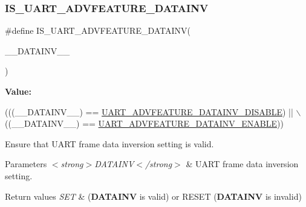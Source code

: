 \subsubsection{\texorpdfstring{I\+S\+\_\+\+U\+A\+R\+T\+\_\+\+A\+D\+V\+F\+E\+A\+T\+U\+R\+E\+\_\+\+D\+A\+T\+A\+I\+NV}{IS\_UART\_ADVFEATURE\_DATAINV}}
{\footnotesize\ttfamily \#define I\+S\+\_\+\+U\+A\+R\+T\+\_\+\+A\+D\+V\+F\+E\+A\+T\+U\+R\+E\+\_\+\+D\+A\+T\+A\+I\+NV(\begin{DoxyParamCaption}\item[{}]{\+\_\+\+\_\+\+D\+A\+T\+A\+I\+N\+V\+\_\+\+\_\+ }\end{DoxyParamCaption})}

{\bfseries Value\+:}
\begin{DoxyCode}
(((\_\_DATAINV\_\_) == \hyperlink{group___u_a_r_t___data___inv_gab9aca2bdf257bd77e42213fdfdb884d3}{UART\_ADVFEATURE\_DATAINV\_DISABLE}) || \(\backslash\)
                                                 ((\_\_DATAINV\_\_) == 
      \hyperlink{group___u_a_r_t___data___inv_ga090ecbcdc57b47144aefee8faf1eaf23}{UART\_ADVFEATURE\_DATAINV\_ENABLE}))
\end{DoxyCode}


Ensure that U\+A\+RT frame data inversion setting is valid. 


\begin{DoxyParams}{Parameters}
{\em $<$strong$>$\+D\+A\+T\+A\+I\+N\+V$<$/strong$>$} & U\+A\+RT frame data inversion setting. \\
\hline
\end{DoxyParams}

\begin{DoxyRetVals}{Return values}
{\em S\+ET} & ({\bfseries D\+A\+T\+A\+I\+NV} is valid) or R\+E\+S\+ET ({\bfseries D\+A\+T\+A\+I\+NV} is invalid) \\
\hline
\end{DoxyRetVals}
\mbox{\label{group___u_a_r_t___private___macros_ga15b46dfa0d80a4583864a31da73e3c99}} 
